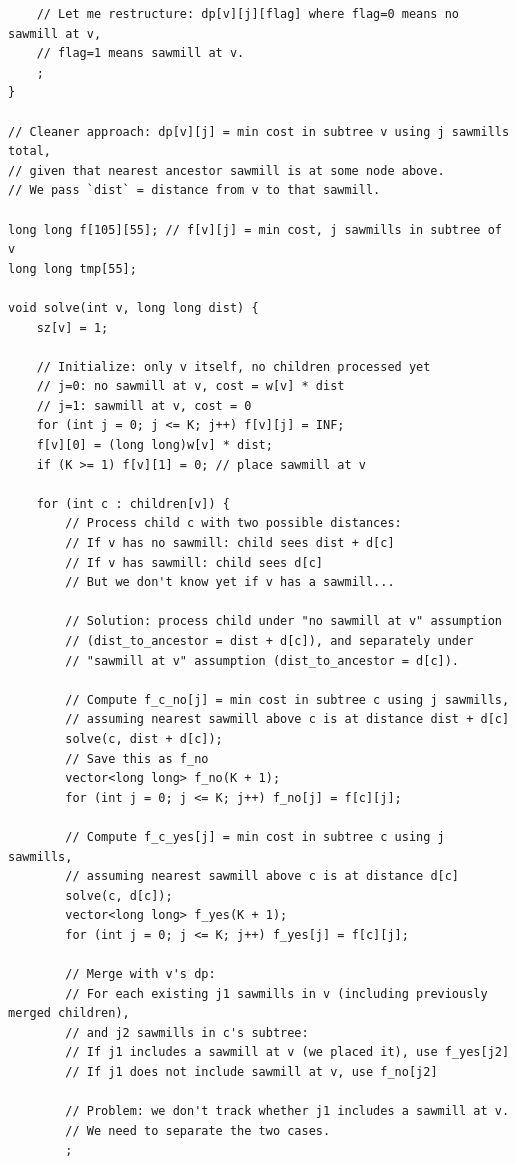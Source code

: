 \documentclass[11pt,a4paper]{article}
\begin{document}
\begin{lstlisting}
    // Let me restructure: dp[v][j][flag] where flag=0 means no sawmill at v,
    // flag=1 means sawmill at v.
    ;
}

// Cleaner approach: dp[v][j] = min cost in subtree v using j sawmills total,
// given that nearest ancestor sawmill is at some node above.
// We pass `dist` = distance from v to that sawmill.

long long f[105][55]; // f[v][j] = min cost, j sawmills in subtree of v
long long tmp[55];

void solve(int v, long long dist) {
    sz[v] = 1;

    // Initialize: only v itself, no children processed yet
    // j=0: no sawmill at v, cost = w[v] * dist
    // j=1: sawmill at v, cost = 0
    for (int j = 0; j <= K; j++) f[v][j] = INF;
    f[v][0] = (long long)w[v] * dist;
    if (K >= 1) f[v][1] = 0; // place sawmill at v

    for (int c : children[v]) {
        // Process child c with two possible distances:
        // If v has no sawmill: child sees dist + d[c]
        // If v has sawmill: child sees d[c]
        // But we don't know yet if v has a sawmill...

        // Solution: process child under "no sawmill at v" assumption
        // (dist_to_ancestor = dist + d[c]), and separately under
        // "sawmill at v" assumption (dist_to_ancestor = d[c]).

        // Compute f_c_no[j] = min cost in subtree c using j sawmills,
        // assuming nearest sawmill above c is at distance dist + d[c]
        solve(c, dist + d[c]);
        // Save this as f_no
        vector<long long> f_no(K + 1);
        for (int j = 0; j <= K; j++) f_no[j] = f[c][j];

        // Compute f_c_yes[j] = min cost in subtree c using j sawmills,
        // assuming nearest sawmill above c is at distance d[c]
        solve(c, d[c]);
        vector<long long> f_yes(K + 1);
        for (int j = 0; j <= K; j++) f_yes[j] = f[c][j];

        // Merge with v's dp:
        // For each existing j1 sawmills in v (including previously merged children),
        // and j2 sawmills in c's subtree:
        // If j1 includes a sawmill at v (we placed it), use f_yes[j2]
        // If j1 does not include sawmill at v, use f_no[j2]

        // Problem: we don't track whether j1 includes a sawmill at v.
        // We need to separate the two cases.
        ;


\end{lstlisting}
\end{document}
